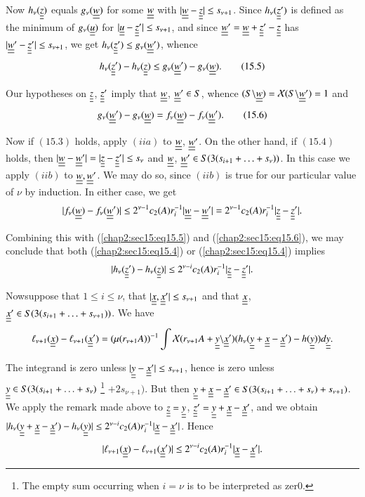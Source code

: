 Now $h_{\nu} (\uub{z})$ equals $g_{\nu} (\uub{w})$ for some $\uub{w}$ with $|\uub{w} - \uub{z}| \leq s_{\nu+1}$. Since $h_{\nu} (\uub{z}')$ is defined as the minimum of $g_{\nu} (\uub{u})$ for $|\uub{u} - \uub{z}'| \leq s_{\nu+1}$, and since $\uub{w}' = \uub{w} + \uub{z}' - \uub{z}$ has $|\uub{w}' - \uub{z}'| \leq s_{\nu+1}$, we get $h_{\nu}(\uub{z}') \leq g_{\nu} (\uub{w}')$, whence
\begin{equation*}
h_{\nu} (\uub{z}') - h_{\nu}(\uub{z}) \leq g_{\nu} (\uub{w}') - g_{\nu} (\uub{w}).\tag{15.5}\label{chap2:sec15:eq15.5}
\end{equation*}

Our hypotheses on $\uub{z}$, $\uub{z}'$ imply that $\uub{w}$, $\uub{w}' \in S$, whence $\mathcal (S \backslash \uub{w}) = \mathcal{X} (S \backslash \uub{w}') = 1$
and
\begin{equation*}
g_{\nu} (\uub{w}') - g_{\nu}(\uub{w}) = f_{\nu} (\uub{w}) - f_{\nu} (\uub{w}').\tag{15.6}\label{chap2:sec15:eq15.6}
\end{equation*}

Now if $(15.3)$ holds, apply $(iia)$ to $\uub{w}$, $\uub{w}'$. On the other hand, if $(15.4)$ holds, then $|\uub{w} - \uub{w}'| = |\uub{z} - \uub{z}'| \leq s_{\nu}$ and $\uub{w}$, $\uub{w}' \in S(3(s_{i+1} + \ldots + s_{\nu}))$. In this case we apply $(iib)$ to $\uub{w}, \uub{w}'$. We may do so, since $(iib)$ is true for our particular value of $\nu$ by induction. In either case, we get
$$
|f_{\nu} (\uub{w}) - f_{\nu}(\uub{w}')| \leq 2^{\nu-1} c_{2} (A) r_{i}^{-1} |\uub{w} - \uub{w}'| = 2^{\nu-1} c_{2} (A) r_{i}^{-1} |\uub{z} - \uub{z}'|.
$$

Combining this with (\ref{chap2:sec15:eq15.5}) and (\ref{chap2:sec15:eq15.6}), we may conclude that both (\ref{chap2:sec15:eq15.4}) or (\ref{chap2:sec15:eq15.4}) implies
$$
|h_{\nu} (\uub{z}') - h_{\nu}(\uub{z})| \leq 2^{\nu - i} c_{2} (A) r_{i}^{-1} |\uub{z} - \uub{z}'|.
$$

Now\pageoriginale suppose that $1 \leq i \leq \nu$, that $|\uub{x}, \uub{x}'| \leq s_{\nu+1}$ and that
$\uub{x}$, $\uub{x}' \in S(3(s_{i+1} + \ldots + s_{\nu+1}))$. We have
{\fontsize{10}{12}\selectfont
$$
\ell_{\nu+1} (\uub{x}) - \ell_{\nu+1} (\uub{x}') = (\mu(r_{\nu+1}
A))^{-1} \int \mathcal{X} (r_{\nu+1} A + \uub{y} \backslash \uub{x}')
(h_{\nu} (\uub{y} + \uub{x} - \uub{x}') - h (\uub{y})) d\uub{y}. 
$$}\relax

The integrand is zero unless $|\uub{y} - \uub{x}'| \leq s_{\nu+1}$, hence is zero unless $\uub{y} \in S(3(s_{i+1} + \ldots + s_{\nu})$
\footnote{The empty sum occurring when $i = \nu$ is to be interpreted as zer0.} $ + 2s_{\nu+1})$. But then $\uub{y} + \uub{x} - \uub{x}' \in S(3(s_{i+1} + \ldots + s_{\nu}) + s_{\nu+1})$. We apply the remark made above to $\uub{z} = \uub{y}$, $\uub{z}' = \uub{y} + \uub{x} - \uub{x}'$, and we obtain $|h_{\nu} (\uub{y} + \uub{x} - \uub{x}') - h_{\nu} (\uub{y})| \leq 2^{\nu-i} c_{2} (A) r_{i}^{-1} |\uub{x} - \uub{x}'|$. Hence
$$
|\ell_{\nu+1} (\uub{x}) - \ell_{\nu+1} (\uub{x}')| \leq 2^{\nu-i} c_{2} (A) r_{i}^{-1} |\uub{x} - \uub{x}'|.
$$

